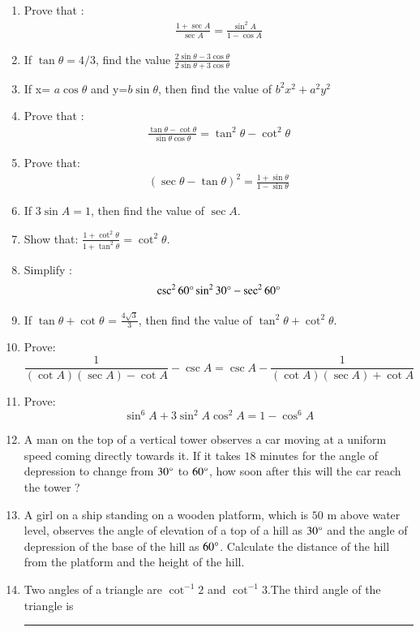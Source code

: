 \begin{enumerate}
\hfill{}\item Prove that :
\begin{align}
\frac{1+\sec A}{\sec A}=\frac{\sin^2 A}{1-\cos A} 
\end{align}

\hfill{}\item If  $\tan \theta = 4/3$, find the value 
$\frac{2\sin \theta -3\cos \theta}{2\sin\theta+3\cos\theta}$

\hfill{}\item If x=  $a\cos\theta$ and y=$b\sin\theta$, then find the value of   $b^2x^2+a^2y^2$

\hfill{}\item Prove that :
\begin{align}
\frac{\tan\theta-\cot\theta}{\sin\theta\cos\theta}=\tan^2\theta-\cot^2\theta 
\end{align}
\hfill{}\item Prove that:
\begin{align}
(\sec\theta-\tan\theta)^2 =\frac{1+\sin\theta}{1-\sin\theta}
\end{align}

		\hfill{}\item If $3\sin A = 1$, then find the value of $\sec A$.
		\hfill{}\item Show that: $\frac{1 + \cot^2{\theta}}{1 + \tan^2{\theta}} = \cot^2{\theta}$.
\hfill{}\item Simplify :$${\csc^{2}{60\degree} \sin^{2}{30\degree} - \sec^{2}{60\degree}}$$
	\hfill{}\item If $\tan{\theta} + \cot{\theta}$ = $\frac{4 \sqrt{3}}{3}$, then find the value of $\tan^{2}{\theta} + \cot^{2}{\theta}$. 
		\hfill{}\item Prove:$$\frac{1}{(\cot A)(\sec A) - \cot A} - \csc A = \csc A - \frac{1}{(\cot A)(\sec A) + \cot A}$$
		\hfill{}\item Prove:$$\sin^{6} A + 3\sin^{2} A \cos^{2} A = 1 - \cos^{6}  A$$
		\hfill{}\item A man on the top of a vertical tower observes a car moving at a uniform speed coming directly towards it. If it takes $18$ minutes for the angle of depression to change from $30\degree$ to $60\degree$, how soon after this will the car reach the tower ?

		\hfill{}\item A girl on a ship standing on a wooden platform, which is $50$ m above water level, observes the angle of elevation of a top of a hill as $30\degree$ and the angle of depression of the base of the hill as $60\degree$. Calculate the distance of the hill from the platform and the height of the hill.
\hfill{}
\item Two angles of a triangle are  $\cot^{-1}2$ and $\cot^{-1}3$.The third angle of the
triangle is \rule{30pt}{1pt}


\end{enumerate}
